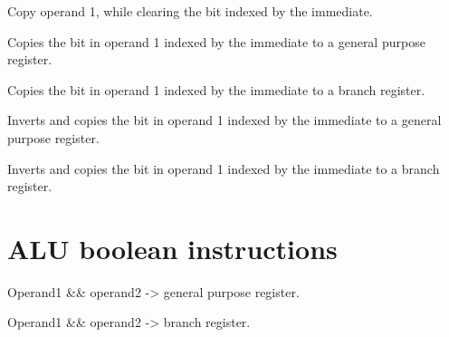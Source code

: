 Copy operand 1, while clearing the bit indexed by the immediate.

Copies the bit in operand 1 indexed by the immediate to a general
purpose register.

Copies the bit in operand 1 indexed by the immediate to a branch
register.

Inverts and copies the bit in operand 1 indexed by the immediate
to a general purpose register.

Inverts and copies the bit in operand 1 indexed by the immediate
to a branch register.

\section{ALU boolean instructions}

Operand1 && operand2 -> general purpose register.

Operand1 && operand2 -> branch register.

